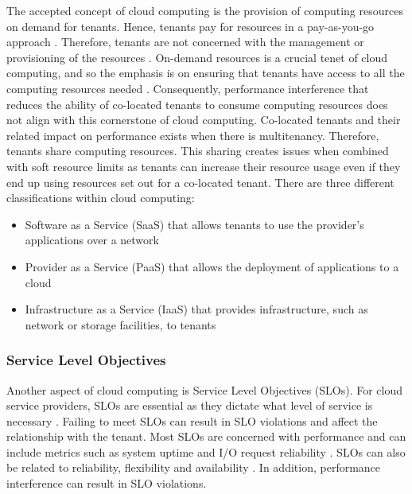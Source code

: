 The accepted concept of cloud computing is the provision of
computing resources on demand for tenants. Hence, tenants pay for
resources in a pay-as-you-go approach \cite{armbrust2010view}.
Therefore, tenants are not concerned with the management or provisioning of the resources \cite{nagesh2014resource}. On-demand resources is a crucial tenet of cloud computing,
and so the emphasis is on ensuring that tenants have access to all the computing resources
needed \cite{armbrust2010view}. Consequently, performance interference that
reduces the ability of co-located tenants to consume computing resources does
not align with this cornerstone of cloud computing. Co-located tenants and
their related impact on performance exists when there is multitenancy. Therefore, tenants share computing resources. This sharing creates issues when combined with soft resource limits as tenants can increase their resource usage even if they end up using resources set out for a
co-located tenant.
\newline\newline
There are three different classifications within cloud computing: 
\begin{itemize}
    \item Software as a Service (SaaS) that allows tenants to use the provider's applications over a
network \cite{furuncu2014scalablegame}
\item Provider as a Service (PaaS) that allows the
deployment of applications to a cloud \cite{farag2017research}
\item Infrastructure as a Service (IaaS) that provides infrastructure, such as
network or storage facilities, to tenants \cite{furuncu2014scalablegame}
\end{itemize}
\subsubsection{Service Level Objectives}
Another aspect of cloud computing is Service Level Objectives (SLOs). For cloud service
providers, SLOs are essential as they dictate what level of service is
necessary \cite{syed2017monitor}. Failing to meet SLOs can result in SLO
violations and affect the relationship with the tenant. Most SLOs are concerned with performance and can include metrics such as system uptime and I/O request reliability \cite{nathuji2010qclouds}. SLOs can also be related to reliability, flexibility and availability
\cite{mahdavi2017systematic}. In addition,
performance interference can result in SLO violations.
